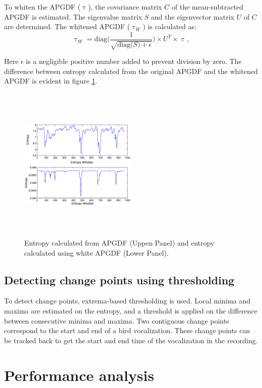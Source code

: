 \documentclass[a4paper]{article}
\begin{document}
To whiten the APGDF ($\uptau$), the covariance matrix $C$ of the mean-subtracted
APGDF is estimated. The eigenvalue matrix $S$ and the eigenvector matrix
$U$ of $C$ are determined. The whitened APGDF
($\uptau_W$) is calculated as:
\begin{equation}
\label{eq:4}
\uptau_W=\text{diag} \bigg(  \frac{1}{\sqrt{\text{diag($S$)}+\epsilon}} 
\bigg )\times \text{$U^T$} \times \uptau,
\end{equation}

Here $\epsilon$ is a negligible positive number added to prevent division by zero. 
 The difference
between entropy calculated from the original APGDF and the whitened APGDF is
evident in figure \ref{fig:entropy}.

\begin{figure}[h]
\centering
\includegraphics[width=0.5\textwidth,height=7.5cm]{Entropy_gd_white_non_white.eps}
\caption{ Entropy calculated from APGDF (Uppen Panel) and entropy calculated using white APGDF (Lower Panel).}
\label{fig:entropy}
\end{figure}



\subsection{Detecting change points using thresholding}
To detect change points, extrema-based thresholding is used. Local minima and
maxima are estimated on the entropy, and a threshold is applied on the
difference between consecutive minima and maxima. Two contiguous change points
correspond to the start and end of a bird vocalization. These change points can
be tracked back to get the start and end time of the vocalization in the
recording.     
   
\section{Performance analysis}
\end{document}
